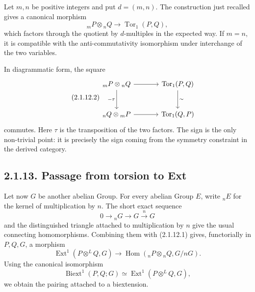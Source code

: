 \documentclass[11pt]{article}
\providecommand{\Tor}{\operatorname{Tor}}
\providecommand{\Hom}{\operatorname{Hom}}
\providecommand{\Ext}{\operatorname{Ext}}
\providecommand{\Biext}{\operatorname{Biext}}
\begin{document}
Let \(m,n\) be positive integers and put \(d=(m,n)\).  The construction just recalled gives a canonical morphism
\begin{equation}\tag{2.1.12.1}
        {}_mP\otimes {}_nQ\longrightarrow \Tor_1(P,Q),
\end{equation}
which factors through the quotient by \(d\)-multiples in the expected way.  If \(m=n\), it is compatible with the anti-commutativity isomorphism under interchange of the two variables.

In diagrammatic form, the square
\begin{equation}\tag{2.1.12.2}
\begin{tikzcd}[column sep=large,row sep=large]
{}_mP\otimes {}_nQ\arrow[r]\arrow[d,"-\tau"']&\Tor_1(P,Q)\arrow[d,"\sim"]\\
{}_nQ\otimes {}_mP\arrow[r]&\Tor_1(Q,P)
\end{tikzcd}
\end{equation}
commutes.  Here \(\tau\) is the transposition of the two factors.  The sign is the only non-trivial point: it is precisely the sign coming from the symmetry constraint in the derived category.

\subsection*{2.1.13. Passage from torsion to Ext}

Let now \(G\) be another abelian Group.  For every abelian Group \(E\), write \({}_nE\) for the kernel of multiplication by \(n\).  The short exact sequence
\begin{equation}\tag{2.1.13.1}
        0\longrightarrow {}_nG\longrightarrow G\xrightarrow{n}G
\end{equation}
and the distinguished triangle attached to multiplication by \(n\) give the usual connecting homomorphisms.  Combining them with (2.1.12.1) gives, functorially in \(P,Q,G\), a morphism
\begin{equation}\tag{2.1.13.2}
        \Ext^1(P\otimes^LQ,G)\longrightarrow
        \Hom({}_nP\otimes {}_nQ,G/nG).
\end{equation}
Using the canonical isomorphism
\[
        \Biext^1(P,Q;G)\simeq \Ext^1(P\otimes^LQ,G),
\]
we obtain the pairing attached to a biextension.
\end{document}
